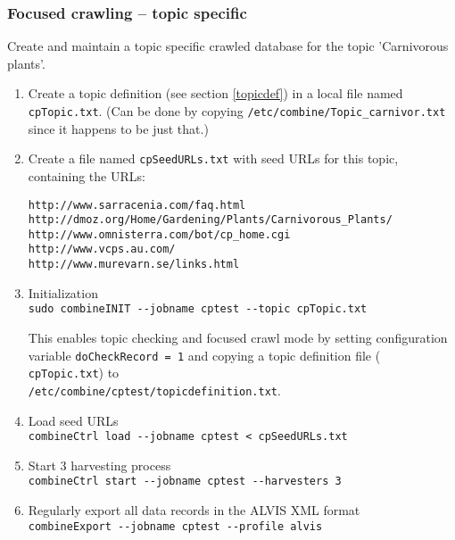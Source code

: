 \subsubsection{Focused crawling -- topic specific}
\label{topicfocus}
Create and maintain a topic specific crawled database for the topic 'Carnivorous plants'.

\begin{enumerate}
\item Create a topic definition (see section \ref{topicdef}) in a local file named {\tt cpTopic.txt}. (Can be done by copying {\tt /etc/combine/Topic\_carnivor.txt} since it happens to be just that.)

\item Create a file named {\tt cpSeedURLs.txt} with seed URLs for this
topic, containing the URLs:
\begin{verbatim}
http://www.sarracenia.com/faq.html
http://dmoz.org/Home/Gardening/Plants/Carnivorous_Plants/
http://www.omnisterra.com/bot/cp_home.cgi
http://www.vcps.au.com/
http://www.murevarn.se/links.html
\end{verbatim}


\item Initialization\\
{\tt  sudo combineINIT \verb+--+jobname cptest \verb+--+topic cpTopic.txt}

 This enables topic checking and focused crawl mode by setting
configuration variable {\tt doCheckRecord = 1} and copying a topic definition file ({\tt
cpTopic.txt}) to\\ {\tt /etc/combine/cptest/topicdefinition.txt}.

\item Load seed URLs\\
{\tt  combineCtrl  load \verb+--+jobname cptest < cpSeedURLs.txt}

\item  Start 3 harvesting process\\
{\tt  combineCtrl  start \verb+--+jobname cptest \verb+--+harvesters 3}

\item  Regularly export all data records in the ALVIS XML format\\
{\tt  combineExport \verb+--+jobname cptest \verb+--+profile alvis}\\

\end{enumerate}

